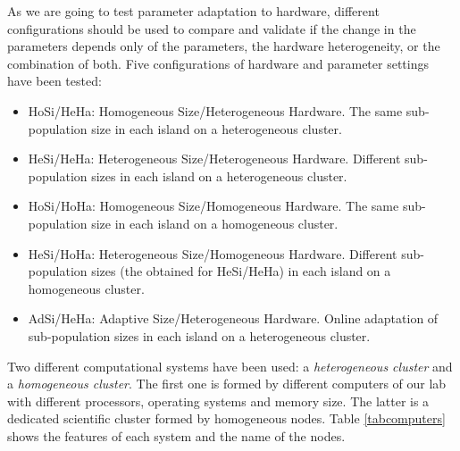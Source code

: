 \documentclass[final,1p,times]{elsarticle}
\begin{document}
As we are going to test parameter adaptation to hardware, different configurations should be used to compare and validate if the change in the parameters depends only of the parameters, the hardware heterogeneity, or the combination of both.
Five configurations of hardware and parameter settings have been tested:


\begin{itemize}
\item HoSi/HeHa: Homogeneous Size/Heterogeneous Hardware. The same sub-population size in each island on a heterogeneous cluster.
\item HeSi/HeHa: Heterogeneous Size/Heterogeneous Hardware. Different sub-population sizes in each island on a heterogeneous cluster.
\item HoSi/HoHa: Homogeneous Size/Homogeneous Hardware. The same sub-population size in each island on a homogeneous cluster.
\item HeSi/HoHa: Heterogeneous Size/Homogeneous Hardware. Different sub-population sizes (the obtained for HeSi/HeHa) in each island on a homogeneous cluster.

\item AdSi/HeHa: Adaptive Size/Heterogeneous Hardware. Online adaptation of sub-population sizes in each island on a heterogeneous cluster.
\end{itemize}

Two different computational systems have been used: a {\em heterogeneous cluster} and a {\em homogeneous cluster}. The first one is formed by different computers of our lab with different processors, operating systems and memory size. The latter is a dedicated scientific cluster formed by homogeneous nodes. Table \ref{tabcomputers} shows the features of each system and the name of the nodes.
\end{document}
